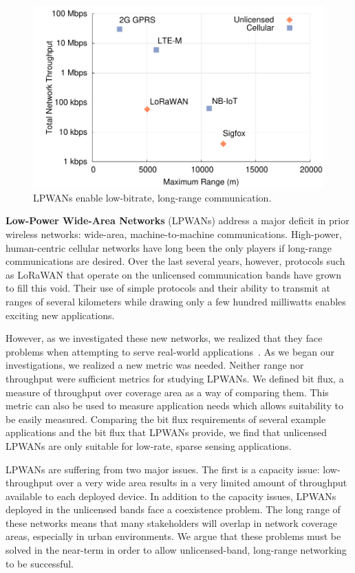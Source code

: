\documentclass[11pt]{article} %
\begin{document}
\begin{figure}
  \vspace{-1em}
  \centering
  \includegraphics[width=0.39\columnwidth]{network-range-throughput}
  \caption*{\sffamily \scriptsize
   LPWANs enable low-bitrate, long-range communication.
  }
  \label{fig:lpwans}
  \vspace{-1em}
\end{figure}

\textbf{Low-Power Wide-Area Networks} (LPWANs) address a major deficit in prior
wireless networks: wide-area, machine-to-machine communications.
%
High-power, human-centric cellular networks
have long been the only players if
long-range communications are desired.
%
Over the last several years, however, protocols such as LoRaWAN that operate on
the unlicensed communication bands have grown to fill this void. Their use of
simple protocols and their ability to transmit at ranges of several kilometers
while drawing only a few hundred milliwatts enables exciting new applications.


However, as we investigated these new networks, we realized that they face
problems when attempting to serve real-world applications~\cite{ghena19lpwans}. As we
began our investigations, we realized a new metric was needed. Neither range
nor throughput were sufficient metrics for studying LPWANs. We defined bit
flux, a measure of throughput over coverage area as a way of comparing them.
This metric can also be used to measure application needs which allows
suitability to be easily measured. Comparing the bit flux requirements of
several example applications and the bit flux that LPWANs provide, we find that
unlicensed LPWANs are only suitable for low-rate, sparse sensing applications. 

LPWANs are suffering from two major issues. The first is a capacity issue:
low-throughput over a very wide area results in a very limited amount of
throughput available to each deployed device. In addition to the capacity
issues, LPWANs deployed in the unlicensed bands face a coexistence problem. The
long range of these networks means that many stakeholders will overlap in
network coverage areas, especially in urban environments. We argue that these
problems must be solved in the near-term in order to allow unlicensed-band,
long-range networking to be successful.
\end{document}
